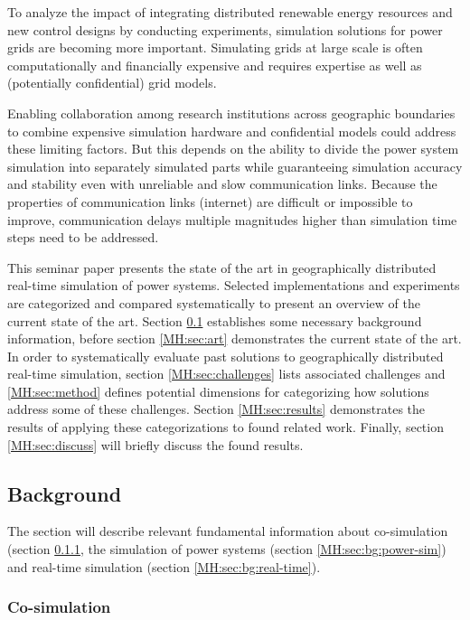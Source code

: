 \documentclass[a4paper]{atseminar}
\begin{document}
To analyze the impact of integrating distributed renewable energy resources and new control designs by conducting experiments, simulation solutions for power grids are becoming more important. Simulating grids at large scale is often computationally and financially expensive and requires expertise as well as (potentially confidential) grid models.

Enabling collaboration among research institutions across geographic boundaries to combine expensive simulation hardware and confidential models could address these limiting factors. 
But this depends on the ability to divide the power system simulation into separately simulated parts while guaranteeing simulation accuracy and stability even with unreliable and slow communication links. Because the properties of communication links (internet) are difficult or impossible to improve, communication delays multiple magnitudes higher than simulation time steps need to be addressed.

This seminar paper presents the state of the art in geographically distributed real-time simulation of power systems. Selected implementations and experiments are categorized and compared systematically to present an overview of the current state of the art. Section \ref{MH:sec:bg} establishes some necessary background information, before section \ref{MH:sec:art} demonstrates the current state of the art. In order to systematically evaluate past solutions to geographically distributed real-time simulation, section \ref{MH:sec:challenges} lists associated challenges and \ref{MH:sec:method} defines potential dimensions
for categorizing how solutions address some of these challenges. Section \ref{MH:sec:results} demonstrates the results of applying these categorizations to found related work. Finally, section \ref{MH:sec:discuss} will briefly discuss the found results.


\subsection{Background}
\label{MH:sec:bg}

The section will describe relevant fundamental information about co-simulation (section \ref{MH:sec:bg:cosim}, the simulation of power systems (section \ref{MH:sec:bg:power-sim}) and real-time simulation (section \ref{MH:sec:bg:real-time}).

\subsubsection{Co-simulation}
\label{MH:sec:bg:cosim}
\end{document}
